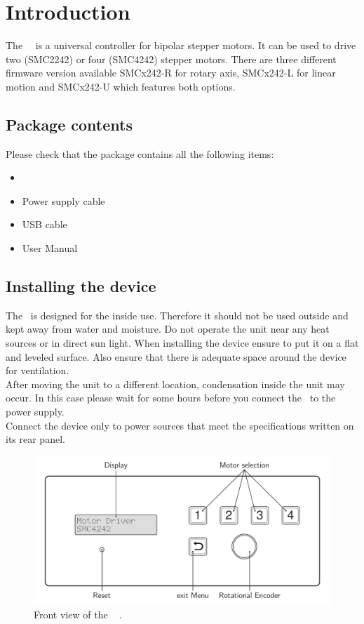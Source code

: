 \section{Introduction}
The \productNumber ~\productName ~is a universal controller for  bipolar stepper motors. It can be used to drive two (SMC2242) or four (SMC4242) stepper motors. There are three different firmware version available SMCx242-R for rotary axis, SMCx242-L for linear motion and SMCx242-U which features both options.

\subsection{Package contents}
Please check that the package contains all the following items:
\begin{itemize}
\item \productNumber ~\productName
\item Power supply cable
\item USB cable
\item User Manual
\end{itemize}

\subsection{Installing the device}
The \productName ~is designed for the inside use. Therefore it should not be used outside and kept away from water and moisture. Do not operate the unit near any heat sources or in direct sun light. When installing the device ensure to put it on a flat and leveled surface. Also ensure that there is adequate space around the device for ventilation.\\
After moving the unit to a different location, condensation inside the unit may occur. In this case please wait for some hours before you connect the \productName ~to the power supply.\\
Connect the device only to power sources that meet the specifications written on its rear panel.

\begin{figure}[h]
  \centering
  \includegraphics[width=12cm]{grafiken/SMCxxx2-0006_3_daub_text.pdf}
  \caption[Front view of the \productNumber ~\productName.]{Front view of
  the \productNumber ~    \productName.}
  \label{frontpanel}
\end{figure}






\newpage
